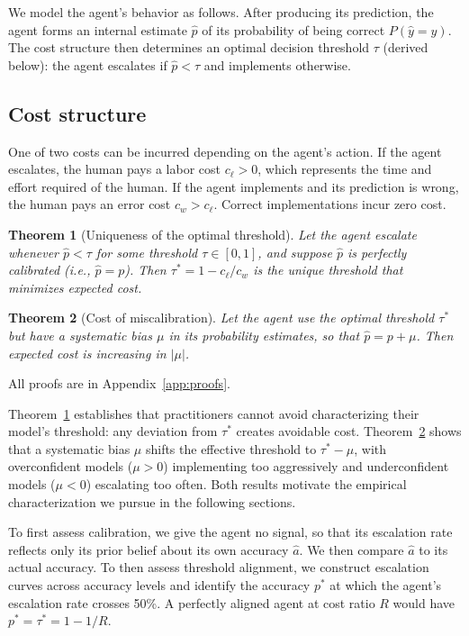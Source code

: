 \documentclass{article}
\newtheorem{theorem}{Theorem}
\begin{document}
We model the agent's behavior as follows. After producing its prediction, the agent forms an internal estimate $\hat{p}$ of its probability of being correct $P(\hat{y} = y)$. The cost structure then determines an optimal decision threshold $\tau$ (derived below): the agent escalates if $\hat{p} < \tau$ and implements otherwise.

\subsection{Cost structure}

One of two costs can be incurred depending on the agent's action. If the agent escalates, the human pays a labor cost $c_\ell > 0$, which represents the time and effort required of the human. If the agent implements and its prediction is wrong, the human pays an error cost $c_w > c_\ell$. Correct implementations incur zero cost.

\begin{theorem}[Uniqueness of the optimal threshold]
\label{thm:threshold}
Let the agent escalate whenever $\hat{p} < \tau$ for some threshold $\tau \in [0,1]$, and suppose $\hat{p}$ is perfectly calibrated (i.e., $\hat{p} = p$). Then $\tau^* = 1 - c_\ell / c_w$ is the unique threshold that minimizes expected cost.
\end{theorem}

\begin{theorem}[Cost of miscalibration]
\label{thm:calibration}
Let the agent use the optimal threshold $\tau^*$ but have a systematic bias $\mu$ in its probability estimates, so that $\hat{p} = p + \mu$. Then expected cost is increasing in $|\mu|$.
\end{theorem}

All proofs are in Appendix~\ref{app:proofs}.

Theorem~\ref{thm:threshold} establishes that practitioners cannot avoid characterizing their model's threshold: any deviation from $\tau^*$ creates avoidable cost. Theorem~\ref{thm:calibration} shows that a systematic bias $\mu$ shifts the effective threshold to $\tau^* - \mu$, with overconfident models ($\mu > 0$) implementing too aggressively and underconfident models ($\mu < 0$) escalating too often. Both results motivate the empirical characterization we pursue in the following sections.

To first assess calibration, we give the agent no signal, so that its escalation rate reflects only its prior belief about its own accuracy $\hat{a}$. We then compare $\hat{a}$ to its actual accuracy. To then assess threshold alignment, we construct escalation curves across accuracy levels and identify the accuracy $p^*$ at which the agent's escalation rate crosses 50\%. A perfectly aligned agent at cost ratio $R$ would have $p^* = \tau^* = 1 - 1/R$.
\end{document}
